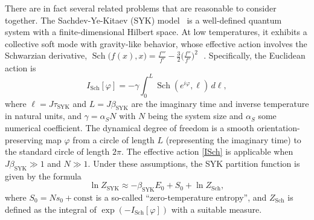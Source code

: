 \documentclass[12pt]{article}
\newcommand{\vp}{\varphi}
\newcommand{\const}{\mathrm{const}}
\DeclareMathOperator{\Sch}{Sch}
\newcommand{\SYK}{\text{SYK}}
\begin{document}
There are in fact several related problems that are reasonable to consider together. The Sachdev-Ye-Kitaev (SYK) model~\cite{SaYe93,Kit.KITP,SoftMode} is a well-defined quantum system with a finite-dimensional Hilbert space. At low temperatures, it exhibits a collective soft mode with gravity-like behavior, whose effective action involves the Schwarzian derivative, $\Sch\bigl(f(x),x\bigr)
=\frac{f'''}{f'}-\frac{3}{2}\bigl(\frac{f''}{f'}\bigr)^2$\,~\cite{Kit.KITP,MS16,SoftMode}. Specifically, the Euclidean action is
\begin{equation}\label{ISch}
I_{\Sch}[\vp]=-\gamma\int_{0}^{L}\Sch(e^{i\vp},\ell)\,d\ell,
\end{equation}
where $\ell=J\tau_{\SYK}$ and $L=J\beta_{\SYK}$ are the imaginary time and inverse temperature in natural units, and $\gamma=\alpha_{S}N$ with $N$ being the system size and $\alpha_{S}$ some numerical coefficient. The dynamical degree of freedom is a smooth orientation-preserving map $\vp$ from a circle of length $L$ (representing the imaginary time) to the standard circle of length $2\pi$. The effective action \eqref{ISch} is applicable when $J\beta_{\SYK}\gg 1$ and $N\gg 1$. Under these assumptions, the SYK partition function is given by the formula
\begin{equation}\label{FSYK}
\ln Z_{\SYK}\approx -\beta_{\SYK}E_0+S_0+\ln Z_{\Sch},
\end{equation}
where $S_0=Ns_0+\const$ is a so-called ``zero-temperature entropy'', and $Z_{\Sch}$ is defined as the integral of $\exp(-I_{\Sch}[\vp])$ with a suitable measure.
\end{document}
